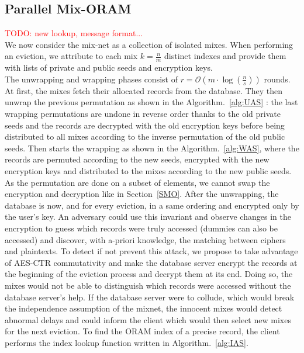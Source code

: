 \documentclass{llncs}
\newcommand{\todo}[1]{\textcolor{red}{TODO: #1}}
\begin{document}
\subsection{Parallel Mix-ORAM}
\todo{new lookup, message format... \\}
%
We now consider the mix-net as a collection of isolated mixes. When performing an eviction, we attribute to each mix  $k=\frac{n}{m}$ distinct indexes and provide them with lists of private and public seeds and encryption keys.\\
The unwrapping and wrapping phases consist of $r=\mathcal{O}\left ( m \cdot \log \left (\frac{n}{s} \right ) \right )$ rounds.
At first, the mixes fetch their allocated records from the database. They then unwrap the previous permutation as shown in the Algorithm.~\ref{alg:UAS} : the last wrapping permutations are undone in reverse order thanks to the old private seeds and the records are decrypted with the old encryption keys before being distributed to all mixes according to the inverse permutation of the old public seeds. Then starts the wrapping as shown in the Algorithm.~\ref{alg:WAS}, where the records are permuted according to the new seeds, encrypted with the new encryption keys and distributed to the mixes according to the new public seeds.\\
As the permutation are done on a subset of elements, we cannot swap the encryption and decryption like in Section~\ref{SMO}. After the unwrapping, the database is now, and for every eviction, in a same ordering and encrypted only by the user's key. An adversary could use this invariant and observe changes in the encryption to guess which records were truly accessed (dummies can also be accessed) and discover, with a-priori knowledge, the matching between ciphers and plaintexts. 
To detect if not prevent this attack, we propose to take advantage of AES-CTR commutativity and make the database server encrypt the records at the beginning of the eviction process and decrypt them at its end. Doing so, the mixes would not be able to distinguish which records were accessed without the database server's help. If the database server were to collude, which would break the independence assumption of the mixnet, the innocent mixes would detect abnormal delays and could inform the client which would then select new mixes for the next eviction.
To find the ORAM index of a precise record, the client performs the index lookup function written in Algorithm.~\ref{alg:IAS}.
\end{document}
